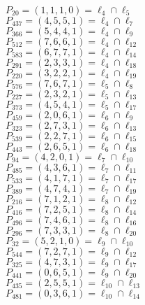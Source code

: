 \documentclass{article}
\begin{document}
{\begin{multicols}{2}
$P_{20} = ( 1, 1, 1, 0 ) = \ell_{4} \cap \ell_{5} $\\
$P_{437} = ( 4, 5, 5, 1 ) = \ell_{4} \cap \ell_{7} $\\
$P_{366} = ( 5, 4, 4, 1 ) = \ell_{4} \cap \ell_{9} $\\
$P_{512} = ( 7, 6, 6, 1 ) = \ell_{4} \cap \ell_{12} $\\
$P_{583} = ( 6, 7, 7, 1 ) = \ell_{4} \cap \ell_{14} $\\
$P_{291} = ( 2, 3, 3, 1 ) = \ell_{4} \cap \ell_{18} $\\
$P_{220} = ( 3, 2, 2, 1 ) = \ell_{4} \cap \ell_{19} $\\
$P_{576} = ( 7, 6, 7, 1 ) = \ell_{5} \cap \ell_{8} $\\
$P_{227} = ( 2, 3, 2, 1 ) = \ell_{5} \cap \ell_{13} $\\
$P_{373} = ( 4, 5, 4, 1 ) = \ell_{5} \cap \ell_{17} $\\
$P_{459} = ( 2, 0, 6, 1 ) = \ell_{6} \cap \ell_{9} $\\
$P_{323} = ( 2, 7, 3, 1 ) = \ell_{6} \cap \ell_{13} $\\
$P_{539} = ( 2, 2, 7, 1 ) = \ell_{6} \cap \ell_{15} $\\
$P_{443} = ( 2, 6, 5, 1 ) = \ell_{6} \cap \ell_{18} $\\
$P_{94} = ( 4, 2, 0, 1 ) = \ell_{7} \cap \ell_{10} $\\
$P_{485} = ( 4, 3, 6, 1 ) = \ell_{7} \cap \ell_{11} $\\
$P_{533} = ( 4, 1, 7, 1 ) = \ell_{7} \cap \ell_{17} $\\
$P_{389} = ( 4, 7, 4, 1 ) = \ell_{7} \cap \ell_{19} $\\
$P_{216} = ( 7, 1, 2, 1 ) = \ell_{8} \cap \ell_{12} $\\
$P_{416} = ( 7, 2, 5, 1 ) = \ell_{8} \cap \ell_{14} $\\
$P_{496} = ( 7, 4, 6, 1 ) = \ell_{8} \cap \ell_{16} $\\
$P_{296} = ( 7, 3, 3, 1 ) = \ell_{8} \cap \ell_{20} $\\
$P_{32} = ( 5, 2, 1, 0 ) = \ell_{9} \cap \ell_{10} $\\
$P_{544} = ( 7, 2, 7, 1 ) = \ell_{9} \cap \ell_{12} $\\
$P_{325} = ( 4, 7, 3, 1 ) = \ell_{9} \cap \ell_{17} $\\
$P_{441} = ( 0, 6, 5, 1 ) = \ell_{9} \cap \ell_{20} $\\
$P_{435} = ( 2, 5, 5, 1 ) = \ell_{10} \cap \ell_{13} $\\
$P_{481} = ( 0, 3, 6, 1 ) = \ell_{10} \cap \ell_{14} $\\

\end{multicols}}
\end{document}
